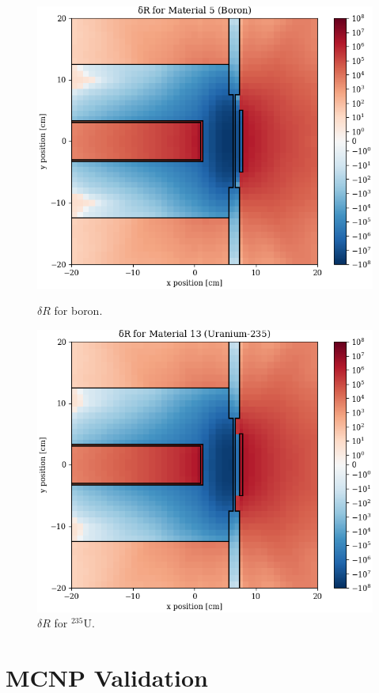 \begin{figure}
  \begin{minipage}{0.49\linewidth}
    \centering
    \includegraphics[width=\linewidth]{content/testprob/dR_05.png}
    \caption{$\delta R$ for boron.}
    \label{fig:tp:dR_05}
  \end{minipage}
  \hfill
  \begin{minipage}{0.49\linewidth}
    \centering
    \includegraphics[width=\linewidth]{content/testprob/dR_13.png}
    \caption{$\delta R$ for ${}^{235}\text{U}$.}
    \label{fig:tp:dR_13}
  \end{minipage}
\end{figure}

\section{MCNP Validation}
\label{sec:bg:tp:mcnp}
